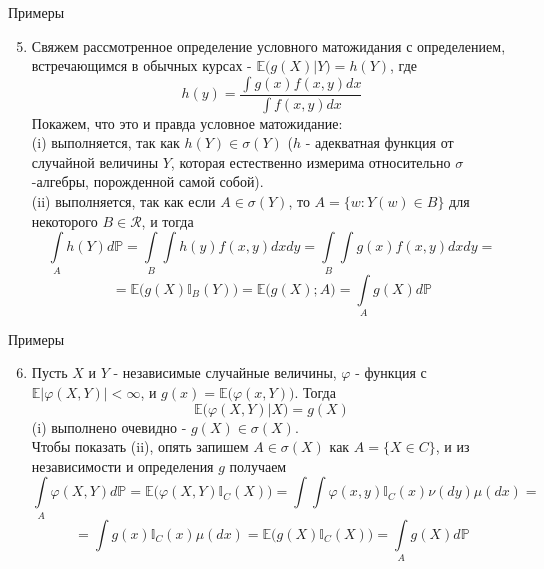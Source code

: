 \documentclass{beamer}%
\theoremstyle{definition}
\renewcommand{\P}{\mathbb{P}}
\begin{document}
\begin{frame}{Примеры}

\begin{enumerate}
\setcounter{enumi}{4}
\item Свяжем рассмотренное определение условного матожидания с определением, встречающимся в обычных курсах - $\mathbb{E}\big(g(X)|Y\big)=h(Y)$, где
$$h(y)=\frac{\int g(x)f(x, y)dx}{\int f(x, y)dx}$$
Покажем, что это и правда условное матожидание:
\\
(i) выполняется, так как $h(Y)\in\sigma(Y)$ ($h$ - адекватная функция от случайной величины $Y$, которая естественно измерима относительно $\sigma$-алгебры, порожденной самой собой).
\\
(ii) выполняется, так как если $A\in\sigma(Y)$, то $A=\{w: Y(w)\in B\}$ для некоторого $B\in\mathcal{R}$, и тогда
$$\int\limits_Ah(Y)d\P=\int\limits_B\int h(y)f(x, y)dxdy=\int\limits_B\int g(x)f(x, y)dxdy=$$
$$=\mathbb{E}\big(g(X)\mathbb{I}_B(Y)\big)=\mathbb{E}\big(g(X); A\big)=\int\limits_Ag(X)d\P$$
\end{enumerate}

\end{frame}


\begin{frame}{Примеры}

\begin{enumerate}
\setcounter{enumi}{5}
\item Пусть $X$ и $Y$ - независимые случайные величины, $\varphi$ - функция с $\mathbb{E}|\varphi(X, Y)|<\infty$, и $g(x)=\mathbb{E}\big(\varphi(x, Y)\big)$. Тогда $$\mathbb{E}\big(\varphi(X, Y)|X\big)=g(X)$$
(i) выполнено очевидно - $g(X)\in\sigma(X)$.
\\
Чтобы показать (ii), опять запишем $A\in\sigma(X)$ как $A=\{X\in C\}$, и из независимости и определения $g$ получаем
$$\int\limits_A\varphi(X, Y)d\P=\mathbb{E}\big(\varphi(X, Y)\mathbb{I}_C(X)\big)=\int\int\varphi(x, y)\mathbb{I}_C(x)\nu(dy)\mu(dx)=$$
$$=\int g(x)\mathbb{I}_C(x)\mu(dx)=\mathbb{E}\big(g(X)\mathbb{I}_C(X)\big)=\int\limits_Ag(X)d\P$$
\end{enumerate}

\end{frame}
\end{document}
